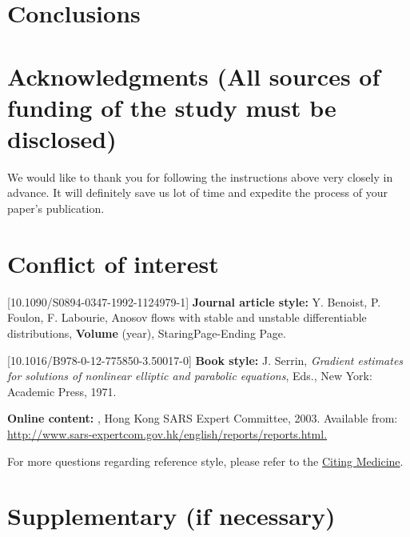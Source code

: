 \documentclass{aims}
\numberwithin{equation}{section}
\begin{document}
\section{Conclusions}

\section*{Acknowledgments (All sources of funding of the study must be disclosed)}
We would like to thank you for following the instructions above 
very closely in advance. It will definitely save us lot of 
time and expedite the process of your paper's publication.

\section*{Conflict of interest}

\begin{thebibliography}{999}

[10.1090/S0894-0347-1992-1124979-1]
      \textbf{Journal article style:} Y. Benoist, P. Foulon, F. Labourie,  {Anosov flows with stable and unstable differentiable distributions},
     \newblock  \textbf{Volume} (year), StaringPage-Ending Page. 


[10.1016/B978-0-12-775850-3.50017-0]
     \textbf{Book style:}
    \newblock J. Serrin, {\em Gradient estimates for solutions of nonlinear elliptic and parabolic equations}, 
     Eds., New York: Academic Press, 1971. 


     \textbf{Online content:}
    , Hong Kong SARS Expert Committee, 2003. Available from: \\ \url{http://www.sars-expertcom.gov.hk/english/reports/reports.html.} 

\end{thebibliography}


For more questions regarding reference style, please refer to the \href{http://www.ncbi.nlm.nih.gov/books/NBK7256/}{Citing Medicine}.

\section*{Supplementary (if necessary)}
\end{document}
